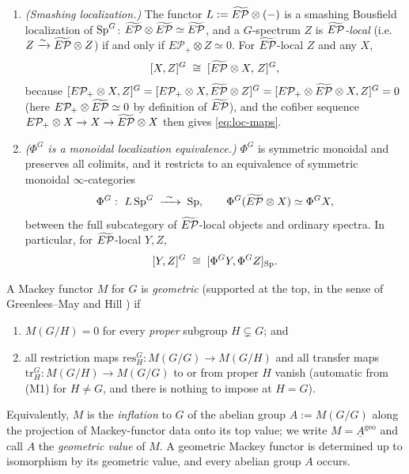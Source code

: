 \begin{enumerate}\setlength\itemsep{3pt}
\item[(L1)] \emph{(Smashing localization.)} The functor $L:=\widetilde{E\mathcal P}\otimes(-)$ is a
smashing Bousfield localization of $\mathrm{Sp}^G$: $\widetilde{E\mathcal P}\otimes\widetilde{E\mathcal P}\simeq\widetilde{E\mathcal P}$,
and a $G$-spectrum $Z$ is \emph{$\widetilde{E\mathcal P}$-local} (i.e.\ $Z\xrightarrow{\sim}\widetilde{E\mathcal P}\otimes
Z$) if and only if $E\mathcal P_+\otimes Z\simeq 0$. For $\widetilde{E\mathcal P}$-local $Z$ and any
$X$,
\begin{equation}\label{eq:loc-maps}
[X,Z]^G\;\cong\;[\widetilde{E\mathcal P}\otimes X,\,Z]^G ,
\end{equation}
because $[E\mathcal P_+\otimes X,Z]^G=[E\mathcal P_+\otimes X,\widetilde{E\mathcal P}\otimes Z]^G=
[E\mathcal P_+\otimes\widetilde{E\mathcal P}\otimes X,Z]^G=0$ (here $E\mathcal P_+\otimes\widetilde{E\mathcal P}\simeq 0$
by definition of $\widetilde{E\mathcal P}$), and the cofiber sequence $E\mathcal P_+\otimes X\to X\to
\widetilde{E\mathcal P}\otimes X$ then gives \eqref{eq:loc-maps}.
\item[(L2)] \emph{($\Phi^G$ is a monoidal localization equivalence.)} $\Phi^G$ is
symmetric monoidal and preserves all colimits, and it restricts to an equivalence
of symmetric monoidal $\infty$-categories
\[
\Phi^G:\ L\,\qfiveSp^G\;\xrightarrow{\ \sim\ }\;\qfiveSp ,
\qquad \Phi^G(\qfiveEP\otimes X)\simeq\Phi^G X ,
\]
between the full subcategory of $\widetilde{E\mathcal P}$-local objects and ordinary spectra. In
particular, for $\widetilde{E\mathcal P}$-local $Y,Z$,
\begin{equation}\label{eq:phi-maps}
[Y,Z]^G\;\cong\;[\Phi^G Y,\Phi^G Z]_{\mathrm{Sp}}.
\end{equation}
\end{enumerate}

\begin{qfivedefinition}\label{def:geom}
A Mackey functor $M$ for $G$ is \emph{geometric} (supported at the top, in the
sense of Greenlees--May and Hill \cite[\S6]{HillPrimer}) if
\begin{enumerate}\setlength\itemsep{2pt}
\item[(M1)] $M(G/H)=0$ for every \emph{proper} subgroup $H\subsetneq G$; and
\item[(M2)] all restriction maps $\mathrm{res}^G_H:M(G/G)\to M(G/H)$ and all
transfer maps $\mathrm{tr}^G_H:M(G/H)\to M(G/G)$ to or from proper $H$ vanish
(automatic from (M1) for $H\ne G$, and there is nothing to impose at $H=G$).
\end{enumerate}
Equivalently, $M$ is the \emph{inflation} to $G$ of the abelian group
$A:=M(G/G)$ along the projection of Mackey-functor data onto its top value; we
write $M=\underline A^{\mathrm{geo}}$ and call $A$ the \emph{geometric value} of
$M$. A geometric Mackey functor is determined up to isomorphism by its geometric
value, and every abelian group $A$ occurs.
\end{qfivedefinition}

